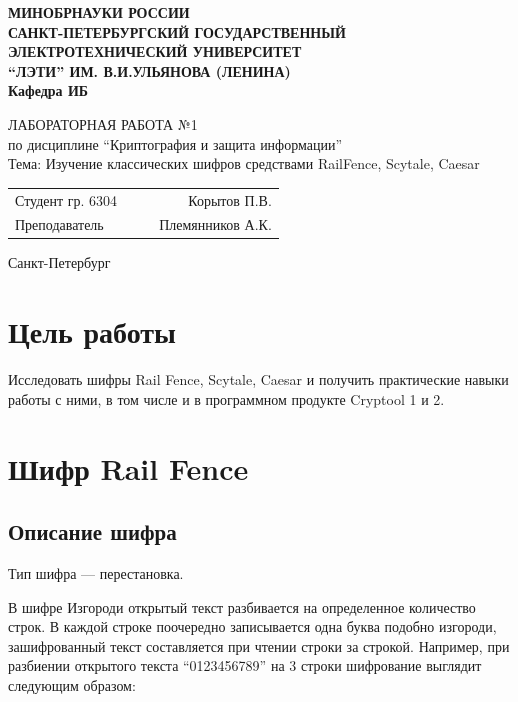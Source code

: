 \documentclass[a4paper, 14pt]{extarticle}
\begin{document}
\begin{titlepage}
    \centering
    {\bfseries
        \uppercase{
            Минобрнауки России \\
            Санкт-Петербургский государственный \\
            Электротехнический университет \\
            \enquote{ЛЭТИ} им. В.И.Ульянова (Ленина)\\
        }
        Кафедра ИБ

        \vspace{\fill}
        \uppercase{Лабораторная работа №1} \\
        по дисциплине \enquote{Криптография и защита информации} \\
        Тема: Изучение классических шифров средствами RailFence, Scytale, Caesar
    }

    \vspace{\fill}
    \begin{tabularx}{0.8\textwidth}{l X c r}
        Студент гр. 6304 & & \underline{\hspace{3cm}} & Корытов П.В.\\
        Преподаватель & & \underline{\hspace{3cm}} & Племянников А.К.
    \end{tabularx}

    \vspace{1cm}
    Санкт-Петербург \\
    \the\year{}
\end{titlepage}

\newpage

\section*{Цель работы}
Исследовать шифры Rail Fence, Scytale, Caesar и получить практические навыки работы с ними, в том числе и в программном продукте Cryptool 1 и 2.

\section{Шифр Rail Fence}
\subsection{Описание шифра}
Тип шифра --- перестановка.

В шифре Изгороди открытый текст разбивается на определенное количество строк. В каждой строке поочередно записывается одна буква подобно изгороди, зашифрованный текст составляется при чтении строки за строкой. Например, при разбиении открытого текста ``0123456789'' на 3 строки шифрование выглядит следующим образом:
\end{document}
